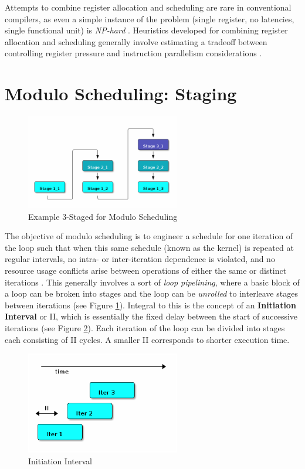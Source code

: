 \documentclass[12pt]{report}
\begin{document}
Attempts to combine register allocation and scheduling are rare in
conventional compilers, as even a simple instance of the problem (single
register, no latencies, single functional unit) is \emph{NP-hard}
\parencite{motwani1995combining} \parencite{Pinter:1993:RAI:173262.155114}.
Heuristics developed for combining register allocation and scheduling
generally involve estimating a tradeoff between controlling register pressure
and instruction parallelism considerations \parencite{motwani1995combining}.

\section{Modulo Scheduling: Staging}
\label{sec:orgd4740d0}
\begin{figure}[htbp]
\centering
\includegraphics[width=0.6\textwidth]{figures/SwingModuloStaging.png}
\caption{\label{fig:SwingStaging}Example 3-Staged for Modulo Scheduling}
\end{figure}

The objective of modulo scheduling is to engineer a schedule for one
iteration of the loop such that when this same schedule (known as the kernel)
is repeated at regular intervals, no intra- or inter-iteration dependence is
violated, and no resource usage conflicts arise between operations of either
the same or distinct iterations \parencite{rau1996iterative}. This generally
involves a sort of \emph{loop pipelining}, where a basic block of a loop can be
broken into stages and the loop can be \emph{unrolled} to interleave stages
between iterations (see Figure \ref{fig:SwingStaging}). Integral to this is the
concept of an \textbf{Initiation Interval} or II, which is essentially the fixed
delay between the start of successive iterations (see Figure
\ref{fig:InitiationInterval}). Each iteration of the loop can be divided into
stages each consisting of II cycles. A smaller II corresponds to shorter
execution time.

\begin{figure}[htbp]
\centering
\includegraphics[width=0.6\textwidth]{figures/InitiationInterval.png}
\caption{\label{fig:InitiationInterval}Initiation Interval}
\end{figure}
\end{document}

